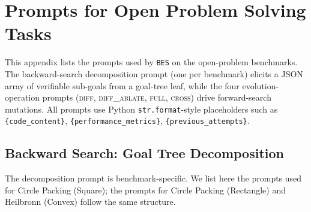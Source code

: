 \documentclass{llmxive}
\providecommand{\ours}{\texttt{BES}}
\begin{document}
\section{Prompts for Open Problem Solving Tasks}
\label{app:prompts}

This appendix lists the prompts used by \ours{} on the open-problem
benchmarks. The backward-search decomposition prompt (one per benchmark)
elicits a JSON array of verifiable sub-goals from a goal-tree leaf, while the
four evolution-operation prompts (\textsc{diff}, \textsc{diff\_ablate},
\textsc{full}, \textsc{cross}) drive forward-search mutations. All prompts
use Python \texttt{str.format}-style placeholders such as
\texttt{\{code\_content\}}, \texttt{\{performance\_metrics\}},
\texttt{\{previous\_attempts\}}.

\subsection{Backward Search: Goal Tree Decomposition}
\label{app:prompts:backward}

The decomposition prompt is benchmark-specific. We list here the
prompts used for Circle Packing (Square); the prompts for Circle Packing (Rectangle) and Heilbronn (Convex) follow the same structure.
\end{document}
